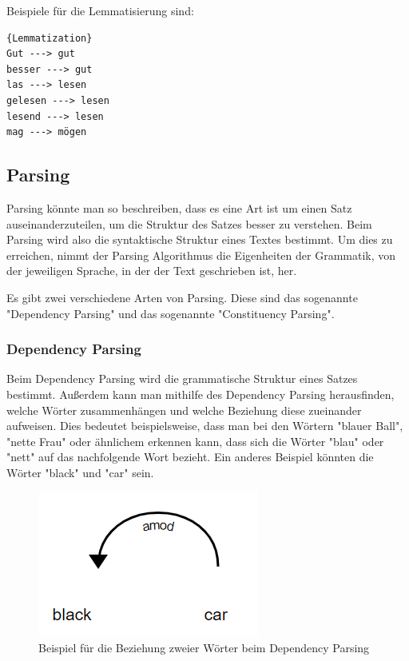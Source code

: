 Beispiele für die Lemmatisierung sind:

\begin{lstlisting}[label={lst:lemmatization},caption={Lemmatisierung von deutschen Wörtern}]{Lemmatization}
Gut ---> gut
besser ---> gut
las ---> lesen
gelesen ---> lesen
lesend ---> lesen
mag ---> mögen

\end{lstlisting}

\subsection{Parsing}

Parsing könnte man so beschreiben, dass es eine Art ist um einen Satz auseinanderzuteilen, um die Struktur des Satzes besser zu verstehen.
Beim Parsing wird also die syntaktische Struktur eines Textes bestimmt.
Um dies zu erreichen, nimmt der Parsing Algorithmus die Eigenheiten der Grammatik, von der jeweiligen Sprache, in der der Text geschrieben ist, her.\cite{textAnalysisMonkeylearn}

Es gibt zwei verschiedene Arten von Parsing.
Diese sind das sogenannte "Dependency Parsing" und das sogenannte "Constituency Parsing".

\subsubsection{Dependency Parsing}

Beim Dependency Parsing wird die grammatische Struktur eines Satzes bestimmt.
Außerdem kann man mithilfe des Dependency Parsing herausfinden, welche Wörter zusammenhängen und welche Beziehung diese zueinander aufweisen.
Dies bedeutet beispielsweise, dass man bei den Wörtern "blauer Ball", "nette Frau" oder ähnlichem erkennen kann, dass sich die Wörter "blau" oder "nett" auf das nachfolgende Wort bezieht.
Ein anderes Beispiel könnten die Wörter "black" und "car" sein.

\begin{figure}[hbt!]
    \centering
    \includegraphics[scale=1]{pics/dependency_parsing}
    \caption{Beispiel für die Beziehung zweier Wörter beim Dependency Parsing~\cite{dependencyParsing}}
    \label{fig:dependency_parsing_relation}
\end{figure}

